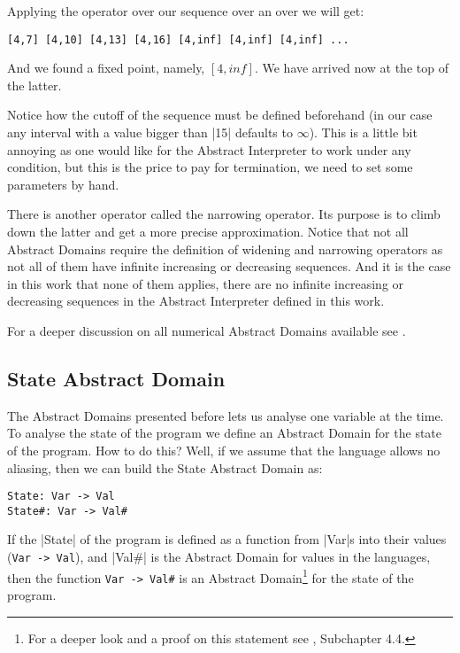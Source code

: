 Applying the operator over our sequence over an over we will get:

\begin{verbatim}
[4,7] [4,10] [4,13] [4,16] [4,inf] [4,inf] [4,inf] ...
\end{verbatim}

And we found a fixed point, namely, $[4,inf]$. We have
arrived now at the top of the latter.

Notice how the cutoff of the sequence must be defined beforehand (in our
case any interval with a value bigger than \pycode|15| defaults to
\(\infty\)). This is a little bit annoying as one would like for the
Abstract Interpreter to work under any condition, but this is the price
to pay for termination, we need to set some parameters by hand.

There is another operator called the narrowing operator. Its purpose is
to climb down the latter and get a more precise approximation. Notice
that not all Abstract Domains require the definition of widening and
narrowing operators as not all of them have infinite increasing or
decreasing sequences. And it is the case in this work that none of them
applies, there are no infinite increasing or decreasing sequences in the
Abstract Interpreter defined in this work.

For a deeper discussion on all numerical Abstract Domains available see
\textcite{mine_weakly_2004}.

\subsection{State Abstract Domain}\label{state-abstract-domain}

The Abstract Domains presented before lets us analyse one variable at
the time. To analyse the state of the program we define an Abstract
Domain for the state of the program. How to do this? Well, if we assume
that the language allows no aliasing, then we can build the State
Abstract Domain as:

\begin{verbatim}
State: Var -> Val
State#: Var -> Val#
\end{verbatim}

If the \pycode|State| of the program is defined as a function from
\pycode|Var|s into their values (\verb|Var -> Val|),
and \pycode|Val#| is the Abstract Domain for values in the languages,
then the function \verb|Var -> Val#| is an Abstract
Domain\footnote{For a deeper look and a proof on this statement see
  \textcite{nielson2015principles}, Subchapter 4.4.} for the state of
the program.

